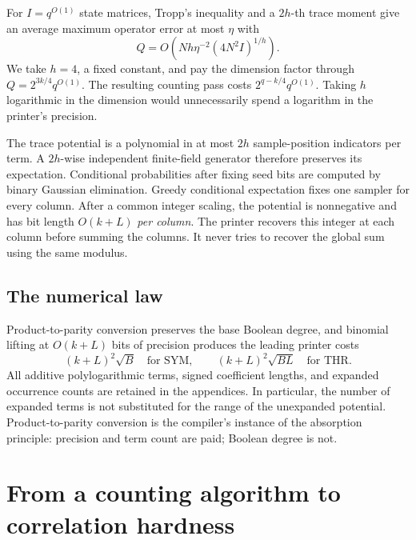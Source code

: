 \documentclass[11pt,letterpaper]{article}
\theoremstyle{definition}
\theoremstyle{remark}
\begin{document}
For $I=q^{O(1)}$ state matrices, Tropp's inequality and a $2h$-th
trace moment give an average maximum operator error at most $\eta$ with
\begin{equation}
Q=O\!\left(Nh\eta^{-2}(4N^2I)^{1/h}\right).
\label{eq:sample-main}
\end{equation}
We take $h=4$, a fixed constant, and pay the dimension factor through
$Q=2^{3k/4}q^{O(1)}$. The resulting counting pass costs
$2^{q-k/4}q^{O(1)}$. Taking $h$ logarithmic in the dimension would
unnecessarily spend a logarithm in the printer's precision.

The trace potential is a polynomial in at most $2h$ sample-position
indicators per term. A $2h$-wise independent finite-field generator
therefore preserves its expectation. Conditional probabilities after
fixing seed bits are computed by binary Gaussian elimination. Greedy
conditional expectation fixes one sampler for every column. After a
common integer scaling, the potential is nonnegative and has bit length
$O(k+L)$ \emph{per column}. The printer recovers this integer at each
column before summing the columns. It never tries to recover the global
sum using the same modulus.

\subsection{The numerical law}
Product-to-parity conversion preserves the base Boolean degree, and
binomial lifting at $O(k+L)$ bits of precision produces the leading
printer costs
\begin{equation}
(k+L)^2\sqrt B\quad\text{for SYM},\qquad
(k+L)^2\sqrt{BL}\quad\text{for THR}.
\label{eq:loads-main}
\end{equation}
All additive polylogarithmic terms, signed coefficient lengths, and
expanded occurrence counts are retained in the appendices. In
particular, the number of expanded terms is not substituted for the
range of the unexpanded potential. Product-to-parity conversion is the
compiler's instance of the absorption principle: precision and term
count are paid; Boolean degree is not.

\section{From a counting algorithm to correlation hardness}
\label{sec:transfer-overview}
\end{document}
